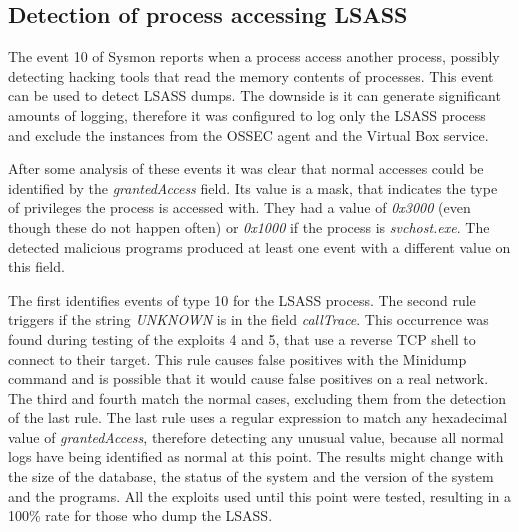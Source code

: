 \subsection{Detection of process accessing LSASS} \label{detect_lsass}
The event 10 of Sysmon reports when a process access another process, possibly detecting hacking tools that read the memory contents of processes\cite{sysmon}.
This event can be used to detect LSASS dumps\cite{sysmon_event_10_lsass}.
\linej
The downside is it can generate significant amounts of logging, therefore it was configured to log only the LSASS process and exclude the instances from the OSSEC agent and the Virtual Box service.
\linej

\linej
After some analysis of these events it was clear that normal accesses could be identified by the \textit{grantedAccess} field. Its value is a mask, that indicates the type of privileges the process is accessed with.
\linej
They had a value of \textit{0x3000} (even though these do not happen often) or \textit{0x1000} if the process is \textit{svchost.exe}. The detected malicious programs produced at least one event with a different value on this field.
\linej

\linej
The first identifies events of type 10 for the LSASS process.
\linej
The second rule triggers if the string \textit{UNKNOWN} is in the field \textit{callTrace}. This occurrence was found during testing of the exploits 4 and 5, that use a reverse TCP shell to connect to their target. This rule causes false positives with the Minidump command and is possible that it would cause false positives on a real network.
\linej
The third and fourth match the normal cases, excluding them from the detection of the last rule.
\linej
The last rule uses a regular expression to match any hexadecimal value of \textit{grantedAccess}, therefore detecting any unusual value, because all normal logs have being identified as normal at this point.
\linej
\linej
The results might change with the size of the database, the status of the system and the version of the system and the programs.
All the exploits used until this point were tested, resulting in a 100\% rate for those who dump the LSASS.

